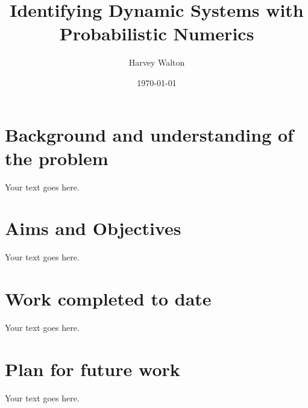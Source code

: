 \documentclass[12pt]{article}
\title{Identifying Dynamic Systems with Probabilistic Numerics}
\author{Harvey Walton}
\date{\today}
\begin{document}
    

    \section{Background and understanding of the problem}
    Your text goes here.

    \section{Aims and Objectives}
    Your text goes here.

    \section{Work completed to date}
    Your text goes here.

    \section{Plan for future work}
    Your text goes here.

    \printbibliography
\end{document}
